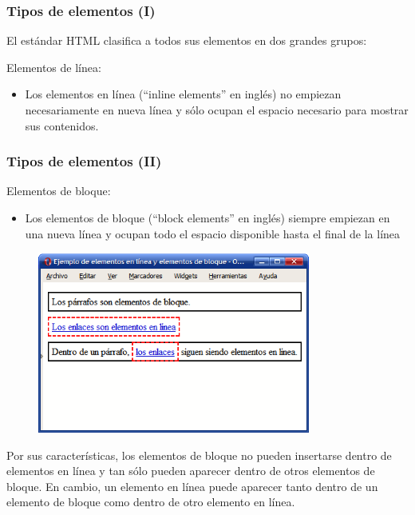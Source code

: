 
\begin{frame}
\frametitle{Tipos de elementos (I)}

El estándar HTML clasifica a todos sus elementos en dos grandes grupos:

Elementos de línea:

\begin{itemize}
  \item Los elementos en línea (``inline elements'' en inglés) no empiezan necesariamente en nueva línea y sólo ocupan el espacio necesario para mostrar sus contenidos.

\end{itemize}

\end{frame}


\begin{frame}
\frametitle{Tipos de elementos (II)}

Elementos de bloque:

\begin{itemize}
  \item Los elementos de bloque (``block elements'' en inglés) siempre empiezan en una nueva línea y ocupan todo el espacio disponible hasta el final de la línea
\end{itemize}

\begin{center}
\begin{figure}[p]
\includegraphics[width=0.8\textwidth]{figs/f0501.png}
\end{figure}
\end{center}

Por sus características, los elementos de bloque no pueden insertarse dentro de elementos en línea y tan sólo pueden aparecer dentro de otros elementos de bloque. En cambio, un elemento en línea puede aparecer tanto dentro de un elemento de bloque como dentro de otro elemento en línea.

\end{frame}



